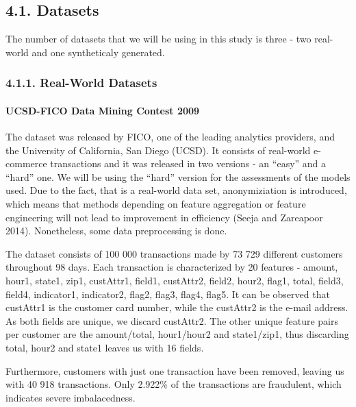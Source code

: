 \documentclass[12pt,]{article}
\let\oldparagraph\paragraph
\renewcommand{\paragraph}[1]{\oldparagraph{#1}\mbox{}}
\begin{document}
\hypertarget{datasets}{%
\subsection{4.1. Datasets}\label{datasets}}

The number of datasets that we will be using in this study is three -
two real-world and one syntheticaly generated.

\hypertarget{real-world-datasets}{%
\subsubsection{4.1.1. Real-World Datasets}\label{real-world-datasets}}

\hypertarget{ucsd-fico-data-mining-contest-2009}{%
\paragraph{UCSD-FICO Data Mining Contest
2009}\label{ucsd-fico-data-mining-contest-2009}}

The dataset was released by FICO, one of the leading analytics
providers, and the University of California, San Diego (UCSD). It
consists of real-world e-commerce transactions and it was released in
two versions - an ``easy'' and a ``hard'' one. We will be using the
``hard'' version for the assessments of the models used. Due to the
fact, that is a real-world data set, anonymiziation is introduced, which
means that methods depending on feature aggregation or feature
engineering will not lead to improvement in efficiency (Seeja and
Zareapoor 2014). Nonetheless, some data preprocessing is done.

The dataset consists of 100 000 transactions made by 73 729 different
customers throughout 98 days. Each transaction is characterized by 20
features - amount, hour1, state1, zip1, custAttr1, field1, custAttr2,
field2, hour2, flag1, total, field3, field4, indicator1, indicator2,
flag2, flag3, flag4, flag5. It can be observed that custAttr1 is the
customer card number, while the custAttr2 is the e-mail address. As both
fields are unique, we discard custAttr2. The other unique feature pairs
per customer are the amount/total, hour1/hour2 and state1/zip1, thus
discarding total, hour2 and state1 leaves us with 16 fields.

Furthermore, customers with just one transaction have been removed,
leaving us with 40 918 transactions. Only 2.922\% of the transactions
are fraudulent, which indicates severe imbalacedness.
\end{document}
